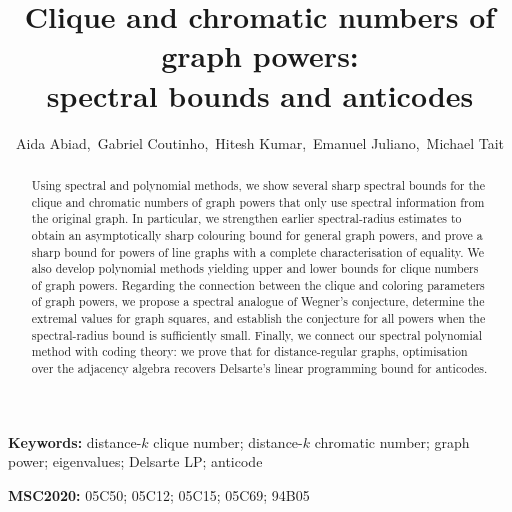 \documentclass[11pt]{article}
\title{\textbf{Clique and chromatic numbers of graph powers: \\spectral bounds and anticodes}}
\author{Aida Abiad,\, Gabriel Coutinho,\, Hitesh Kumar,\, Emanuel Juliano,\, Michael Tait}
\date{}
\theoremstyle{plain}
\numberwithin{equation}{section}
\begin{document}
\maketitle
\begin{abstract}
Using spectral and polynomial methods, we show several sharp spectral bounds for the clique and chromatic numbers of graph powers that only use spectral information from the original graph. In particular, we strengthen earlier spectral-radius estimates to obtain an asymptotically sharp colouring bound for general graph powers, and prove a sharp bound for powers of line graphs with a complete characterisation of equality. We also develop polynomial methods yielding upper and lower 
bounds for clique numbers of graph powers. Regarding the connection between the clique and coloring parameters of graph powers, we propose a spectral analogue of Wegner’s conjecture, determine the extremal values for graph squares, and establish the conjecture for all powers when the spectral-radius bound is sufficiently small. Finally, we connect our spectral polynomial method with coding theory: we prove that for distance-regular graphs, optimisation over the adjacency algebra recovers Delsarte's linear programming bound for anticodes.
\end{abstract}



\noindent
\textbf{Keywords:} distance-$k$ clique number; distance-$k$ chromatic number; graph power; eigenvalues; Delsarte LP; anticode

\noindent
\textbf{MSC2020:} 05C50; 05C12; 05C15; 05C69; 94B05

\end{document}
